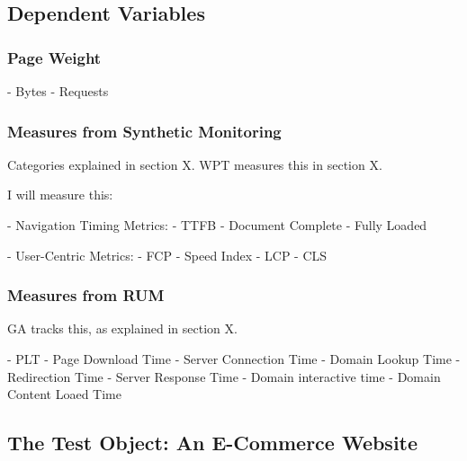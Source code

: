 




\subsection{Dependent Variables}


\subsubsection{Page Weight}

	- Bytes
	- Requests

\subsubsection{Measures from Synthetic Monitoring}

Categories explained in section X.
WPT measures this in section X.

I will measure this:

- Navigation Timing Metrics:
	- TTFB
	- Document Complete
	- Fully Loaded
	
- User-Centric Metrics:
	- FCP
	- Speed Index
	- LCP
	- CLS

\subsubsection{Measures from RUM}

GA tracks this, as explained in section X.

- PLT
- Page Download Time
- Server Connection Time
- Domain Lookup Time
- Redirection Time
- Server Response Time
- Domain interactive time
- Domain Content Loaed Time




\subsection{The Test Object: An E-Commerce Website}

